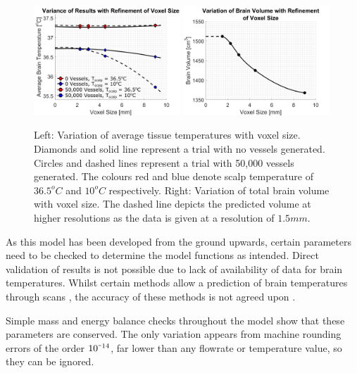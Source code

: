 \documentclass[11pt,english,a4paper,twoside,openright]{report}
\newcommand{\smallminus}{\scalebox{0.5}[1.0]{$-$}}
\begin{document}
{{{{{{{{\begin{figure}[h]
	\centering
	\includegraphics[width=0.49\textwidth]{Chapter3/MeshDependency_Corr}
	\includegraphics[width=0.49\textwidth]{Chapter3/MeshDependency2}
	\caption[Variations of tempeature and brain volume with decreasing voxel size]{Left: Variation of average tissue temperatures with voxel size. Diamonds and solid line represent a trial with no vessels generated. Circles and dashed lines represent a trial with 50,000 vessels generated. The colours red and blue denote scalp temperature of $36.5^{o}C$ and $10^{o}C$ respectively. Right: Variation of total brain volume with voxel size. The dashed line depicts the predicted volume at higher resolutions as the data is given at a resolution of $1.5mm$.}
	\label{fig:MeshDependency}
\end{figure}

As this model has been developed from the ground upwards, certain parameters need to be checked to determine the model functions as intended. Direct validation of results is not possible due to lack of availability of data for brain temperatures. Whilst certain methods allow a prediction of brain temperatures through scans \cite{marshall2006measurement}, the accuracy of these methods is not agreed upon \cite{thrippleton2014reliability}. 

Simple mass and energy balance checks throughout the model show that these parameters are conserved. The only variation appears from machine rounding errors of the order $10^{\smallminus14}$, far lower than any flowrate or temperature value, so they can be ignored. 

}}}}}}}}
\end{document}
